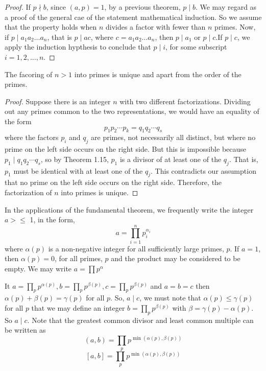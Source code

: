 \documentclass[11pt]{article}
\begin{document}
\begin{proof}
    If \(p \nmid b\), since \((a, p) = 1\), by a previous theorem, \(p \mid b\). We may regard as a proof of the general cae of the statement mathematical induction. So we assume that the property holds when \(n\) divides a factor with fewer than \(n\) primes.
    Now, if \(p \mid a_1a_2\ldots a_n\), that is \(p \mid ac\), where \(c = a_1a_2\ldots a_n\), then \(p \mid a_1\) or \(p \mid c\).If \(p \mid c\), we apply the induction hypthesis to conclude that \(p \mid i\), for some subscript \(i = 1, 2, \ldots, n\).
\end{proof}

\begin{theorem}
    The facoring of \(n > 1\) into primes is unique and apart from the order of the primes.
\end{theorem}

\begin{proof}
    Suppose there is an integer \(n\) with two different factorizations. Dividing out any primes common to the two representations, we would have an equality of the form
    \[
        p_1 p_2 \cdots p_k = q_1 q_2 \cdots q_s
    \]
    where the factors \(p_i\) and \(q_j\) are primes, not necessarily all distinct,
    but where no prime on the left side occurs on the right side. But this is
    impossible because \(p_1 \mid q_1 q_2 \cdots q_s\), so by Theorem 1.15, \(p_1\)
    is a divisor of at least one of the \(q_j\). That is, \(p_1\) must be identical
    with at least one of the \(q_j\). This contradicts our assumption that no prime
    on the left side occurs on the right side. Therefore, the factorization of
    \(n\) into primes is unique.
\end{proof}

In the applications of the fundamental theorem, we frequently write the integer
\(a > \leqslant\) 1, in the form,
\[
    a = \prod_{i=1}^{n} p_i^{\alpha_i}
\]
where \(\alpha(p)\) is a non-negative integer for all sufficiently large
primes, \(p\). If \(a = 1\), then \(\alpha(p) = 0\), for all primes, \(p\) and
the product may be considered to be empty. We may write \(a = \prod
p^{\alpha}\)

It \(a = \prod_{p} p^{\alpha(p)}, b = \prod_{p} p^{\beta(p)}, c = \prod_{p}
p^{\beta(p)}\) and \(a = b = c\) then \(\alpha(p) + \beta(p) = \gamma(p)\) for
all \(p\). So, \(a \mid c\), we must note that \(\alpha(p) \leqslant
\gamma(p)\) for all \(p\) that we may define an integer \(b =
\prod_{p}p^{\beta(p)}\) with \(\beta = \gamma(p) - \alpha(p)\). So \(a \mid
c\). Note that the greatest common divisor and least common multiple can be
written as \[(a, b) = \prod_{p} p^{\min(\alpha(p), \beta(p))}\] \[[a, b] = \prod_{p} p^{\min(\alpha(p), \beta(p))}\]
\end{document}
